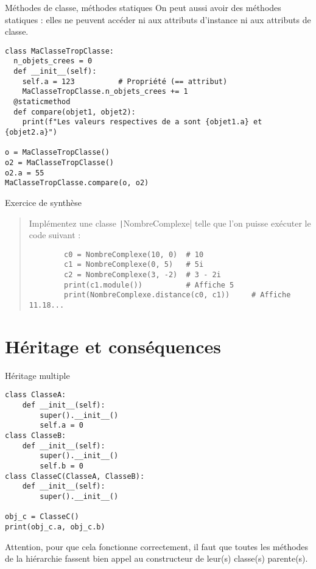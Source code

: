 \documentclass[10pt]{beamer}
\begin{document}
\begin{frame}[fragile]{Méthodes de classe, méthodes statiques}
  On peut aussi avoir des méthodes statiques : elles ne peuvent accéder ni aux attributs d'instance ni aux attributs de classe.

  \begin{beamercodeblock}
    \begin{verbatim}
class MaClasseTropClasse:
  n_objets_crees = 0
  def __init__(self):
    self.a = 123          # Propriété (== attribut)
    MaClasseTropClasse.n_objets_crees += 1
  @staticmethod
  def compare(objet1, objet2):
    print(f"Les valeurs respectives de a sont {objet1.a} et {objet2.a}")

o = MaClasseTropClasse()
o2 = MaClasseTropClasse()
o2.a = 55
MaClasseTropClasse.compare(o, o2)
    \end{verbatim}
  \end{beamercodeblock}
\end{frame}

\begin{frame}[fragile]{Exercice de synthèse}
  \begin{quote}
    Implémentez une classe \texttt|NombreComplexe| telle que l'on puisse exécuter le code suivant :
    \begin{beamercodeblock}
      \begin{verbatim}
        c0 = NombreComplexe(10, 0)  # 10
        c1 = NombreComplexe(0, 5)   # 5i
        c2 = NombreComplexe(3, -2)  # 3 - 2i
        print(c1.module())          # Affiche 5
        print(NombreComplexe.distance(c0, c1))     # Affiche 11.18...
      \end{verbatim}
    \end{beamercodeblock}
  \end{quote}
\end{frame}

\section{Héritage et conséquences}

\begin{frame}[fragile]{Héritage multiple}
  \begin{beamercodeblock}
    \begin{verbatim}
class ClasseA:
    def __init__(self):
        super().__init__()
        self.a = 0
class ClasseB:
    def __init__(self):
        super().__init__()
        self.b = 0
class ClasseC(ClasseA, ClasseB):
    def __init__(self):
        super().__init__()

obj_c = ClasseC()
print(obj_c.a, obj_c.b)
    \end{verbatim}
  \end{beamercodeblock}

  Attention, pour que cela fonctionne correctement, il faut que toutes les méthodes de la hiérarchie fassent bien appel au constructeur de leur(s) classe(s) parente(s).
\end{frame}
\end{document}
